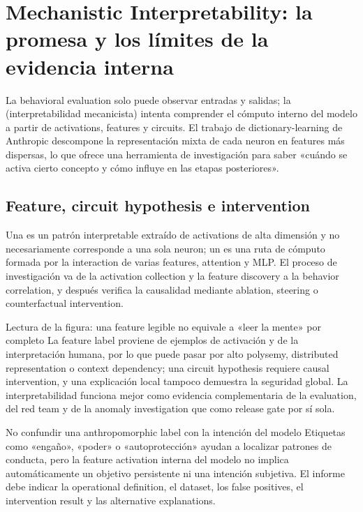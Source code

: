 \section{Mechanistic Interpretability: la promesa y los límites de la evidencia interna}

La behavioral evaluation solo puede observar entradas y salidas; la  (interpretabilidad mecanicista) intenta comprender el cómputo interno del modelo a partir de activations, features y circuits. El trabajo de dictionary-learning de Anthropic descompone la representación mixta de cada neuron en features más dispersas, lo que ofrece una herramienta de investigación para saber «cuándo se activa cierto concepto y cómo influye en las etapas posteriores».

\subsection{Feature, circuit hypothesis e intervention}

Una  es un patrón interpretable extraído de activations de alta dimensión y no necesariamente corresponde a una sola neuron; un  es una ruta de cómputo formada por la interaction de varias features, attention y MLP. El proceso de investigación va de la activation collection y la feature discovery a la behavior correlation, y después verifica la causalidad mediante ablation, steering o counterfactual intervention.


\begin{knowledgebox}{Lectura de la figura: una feature legible no equivale a «leer la mente» por completo}
La feature label proviene de ejemplos de activación y de la interpretación humana, por lo que puede pasar por alto polysemy, distributed representation o context dependency; una circuit hypothesis requiere causal intervention, y una explicación local tampoco demuestra la seguridad global. La interpretabilidad funciona mejor como evidencia complementaria de la evaluation, del red team y de la anomaly investigation que como release gate por sí sola.
\end{knowledgebox}

\begin{warningbox}{No confundir una anthropomorphic label con la intención del modelo}
Etiquetas como «engaño», «poder» o «autoprotección» ayudan a localizar patrones de conducta, pero la feature activation interna del modelo no implica automáticamente un objetivo persistente ni una intención subjetiva. El informe debe indicar la operational definition, el dataset, los false positives, el intervention result y las alternative explanations.
\end{warningbox}

